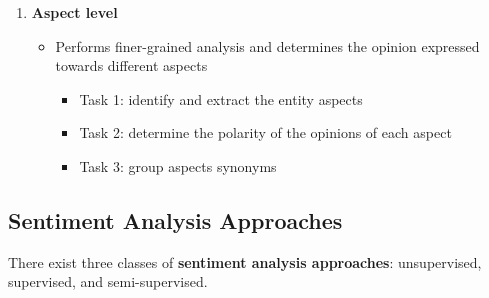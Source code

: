 \documentclass{article}
\begin{document}
\begin{enumerate}[label=\Alph*]
    \item \textbf{Aspect level}
        \begin{itemize}
            \item Performs finer-grained analysis and determines the opinion expressed towards different aspects
                \begin{itemize}
                    \item Task 1: identify and extract the entity aspects
                    \item Task 2: determine the polarity of the opinions of each aspect
                    \item Task 3: group aspects synonyms
                \end{itemize}
        \end{itemize}
\end{enumerate}

\subsection{Sentiment Analysis Approaches}
There exist three classes of \textbf{sentiment analysis approaches}: unsupervised, supervised, and semi-supervised.
\end{document}
